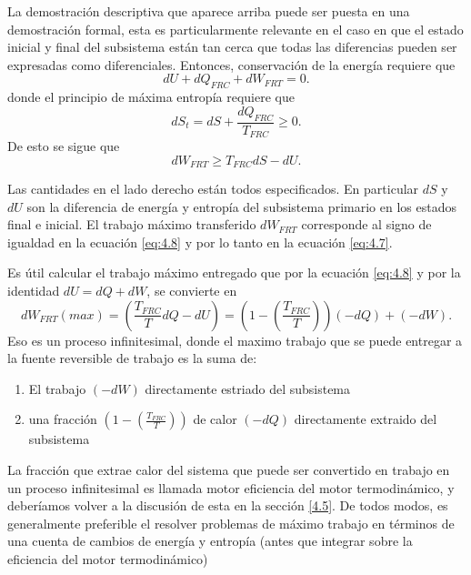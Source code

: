 \documentclass{report}
\begin{document}
La demostración descriptiva que aparece arriba puede ser puesta en una demostración formal, esta es particularmente relevante en el caso en que el estado inicial y final del subsistema están tan cerca que todas las diferencias pueden ser expresadas como diferenciales. Entonces, conservación de la energía requiere que
\begin{equation}
  dU + dQ_{FRC} + dW_{FRT} = 0
.\end{equation}
donde el principio de máxima entropía requiere que
\begin{equation}
  dS_{t} = dS + \frac{dQ_{FRC}}{T_{FRC}}\geq 0\label{eq:4.7}
.\end{equation}
De esto se sigue que
\begin{equation}
  dW_{FRT}\geq T_{FRC}dS-dU\label{eq:4.8}
.\end{equation}

Las cantidades en el lado derecho están todos especificados. En particular $dS$ y  $dU$ son la diferencia de energía y entropía del subsistema primario en los estados final e inicial. El trabajo máximo transferido  $dW_{FRT}$ corresponde al signo de igualdad en la ecuación \ref{eq:4.8} y por lo tanto en la ecuación \ref{eq:4.7}.

Es útil calcular el trabajo máximo entregado que por la ecuación \ref{eq:4.8} y por la identidad $dU = dQ + dW$, se convierte en
 \begin{equation}
   dW_{FRT}(max)=\left( \frac{T_{FRC}}{T}dQ - dU \right) = \left( 1-\left( \frac{T_{FRC}}{T} \right)  \right) (-dQ) + (-dW)
.\end{equation}
Eso es un proceso infinitesimal, donde el maximo trabajo que se puede entregar a la fuente reversible de trabajo es la suma de:
\begin{enumerate}
  \item El trabajo $\left( -dW \right)$ directamente estriado del subsistema
  \item una fracción $\left( 1-\left( \frac{T_{FRC}}{T} \right)  \right) $ de calor $\left( -dQ \right) $ directamente extraido del subsistema
\end{enumerate}

La fracción que extrae calor del sistema que puede ser convertido en trabajo en un proceso infinitesimal es llamada motor eficiencia del motor termodinámico, y deberíamos volver a la discusión de esta en la sección \ref{4.5}. De todos modos, es generalmente preferible el resolver problemas de máximo trabajo en términos de una cuenta de cambios de energía y entropía (antes que integrar sobre la eficiencia del motor termodinámico)
\end{document}
